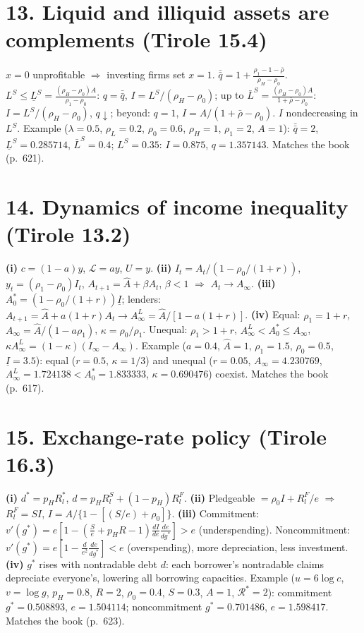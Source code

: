 \documentclass[11pt,a4paper]{article}
\newcommand{\Rc}{\mathcal{R}}
\begin{document}
\section*{13. Liquid and illiquid assets are complements (Tirole 15.4)}
$x=0$ unprofitable $\Rightarrow$ investing firms set $x=1$. $\bar{\bar q}=1+\frac{\rho_1-1-\bar\rho}{\rho_H-\rho_0}$. $L^S\leq\underline L^S=\frac{(\rho_H-\rho_0)A}{\rho_1-\rho_0}$: $q=\bar{\bar q}$, $I=L^S/(\rho_H-\rho_0)$; up to $\bar L^S=\frac{(\rho_H-\rho_0)A}{1+\bar\rho-\rho_0}$: $I=L^S/(\rho_H-\rho_0)$, $q\downarrow$; beyond: $q=1$, $I=A/(1+\bar\rho-\rho_0)$. $I$ nondecreasing in $L^S$.
Example ($\lambda=0.5$, $\rho_L=0.2$, $\rho_0=0.6$, $\rho_H=1$, $\rho_1=2$, $A=1$): $\bar{\bar q}=2$, $\underline L^S=0.285714$, $\bar L^S=0.4$; $L^S=0.35$: $I=0.875$, $q=1.357143$. Matches the book (p.~621).

\section*{14. Dynamics of income inequality (Tirole 13.2)}
\textbf{(i)} $c=(1-a)y$, $\mathcal L=ay$, $U=y$.
\textbf{(ii)} $I_t=A_t/(1-\rho_0/(1+r))$, $y_t=(\rho_1-\rho_0)I_t$, $A_{t+1}=\hat A+\beta A_t$, $\beta<1$ $\Rightarrow$ $A_t\to A_\infty$.
\textbf{(iii)} $A_0^*=(1-\rho_0/(1+r))\underline I$; lenders: $A_{t+1}=\hat A+a(1+r)A_t\to A_\infty^L=\hat A/[1-a(1+r)]$.
\textbf{(iv)} Equal: $\rho_1=1+r$, $A_\infty=\hat A/(1-a\rho_1)$, $\kappa=\rho_0/\rho_1$. Unequal: $\rho_1>1+r$, $A_\infty^L<A_0^*\leq A_\infty$, $\kappa A_\infty^L=(1-\kappa)(I_\infty-A_\infty)$.
Example ($a=0.4$, $\hat A=1$, $\rho_1=1.5$, $\rho_0=0.5$, $\underline I=3.5$): equal ($r=0.5$, $\kappa=1/3$) and unequal ($r=0.05$, $A_\infty=4.230769$, $A_\infty^L=1.724138<A_0^*=1.833333$, $\kappa=0.690476$) coexist. Matches the book (p.~617).

\section*{15. Exchange-rate policy (Tirole 16.3)}
\textbf{(i)} $d^*=p_HR_l^*$, $d=p_HR_l^S+(1-p_H)R_l^F$.
\textbf{(ii)} Pledgeable $=\rho_0I+R_l^F/e$ $\Rightarrow$ $R_l^F=SI$, $I=A/\{1-[(S/e)+\rho_0]\}$.
\textbf{(iii)} Commitment: $v'(g^*)=e[1-(\frac Se+p_HR-1)\frac{dI}{de}\frac{de}{dg^*}]>e$ (underspending). Noncommitment: $v'(g^*)=e[1-\frac{d}{e^2}\frac{de}{dg^*}]<e$ (overspending), more depreciation, less investment.
\textbf{(iv)} $g^*$ rises with nontradable debt $d$: each borrower's nontradable claims depreciate everyone's, lowering all borrowing capacities.
Example ($u=6\log c$, $v=\log g$, $p_H=0.8$, $R=2$, $\rho_0=0.4$, $S=0.3$, $A=1$, $\Rc^*=2$): commitment $g^*=0.508893$, $e=1.504114$; noncommitment $g^*=0.701486$, $e=1.598417$. Matches the book (p.~623).
\end{document}
